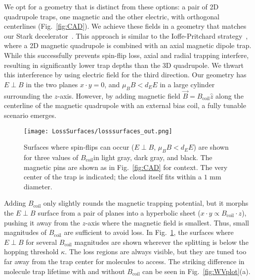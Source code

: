 \documentclass[%
 reprint,
 amsmath,amssymb,
 aps,
prl,
]{revtex4-1}
\newcommand{\bcl}{{$B_\text{coil}$}}
\newcommand{\epb}{{$E\!\perp\!B$}}
\begin{document}
We opt for a geometry that is distinct from these options: a pair of 2D quadrupole traps, one magnetic and the other electric, with orthogonal centerlines (Fig.~\ref{fig:CAD}). We achieve these fields in a geometry that matches our Stark decelerator~\cite{Bochinski2003}. This approach is similar to the Ioffe-Pritchard strategy~\cite{pritchard1983}, where a 2D magnetic quadrupole is combined with an axial magnetic dipole trap. While this successfully prevents spin-flip loss, axial and radial trapping interfere, resulting in significantly lower trap depths than the 3D quadrupole. We thwart this interference by using electric field for the third direction. Our geometry has \epb{} in the two planes $x\cdot y=0$, and $\mu_BB < d_EE$ in a large cylinder surrounding the $z$-axis. However, by adding magnetic field $\vec{B}=B_\text{coil}\hat{z}$ along the centerline of the magnetic quadrupole with an external bias coil, a fully tunable scenario emerges. %


\begin{figure}[tb]
\texttt{[image: LossSurfaces/losssurfaces\_out.png]}%
\caption{
Surfaces where spin-flips can occur (\epb{}, $\mu_BB<d_EE$) are shown for three values of \bcl in light gray, dark gray, and black. The magnetic pins are shown as in Fig.~\ref{fig:CAD} for context. The very center of the trap is indicated; the cloud itself fits within a \raisebox{2.5px}{\texttildelow} $\!\!1\text{ mm}$ diameter.
\label{fig:LSurfs}}
\end{figure}

Adding \bcl{} only slightly rounds the magnetic trapping potential, but it morphs the \epb{} surface from a pair of planes into a hyperbolic sheet ($x\cdot y\propto B_\text{coil}\cdot z$), pushing it away from the $z$-axis where the magnetic field is smallest. Thus, small magnitudes of \bcl{} are sufficient to avoid loss. In Fig.~\ref{fig:LSurfs}, the surfaces where \epb{} for several \bcl{} magnitudes are shown wherever the splitting is below the hopping threshold $\kappa$. The loss regions are always visible, but they are tuned too far away from the trap center for molecules to access. The striking difference in molecule trap lifetime with and without \bcl{} can be seen in Fig.~\ref{fig:WVplot}(a).
\end{document}
